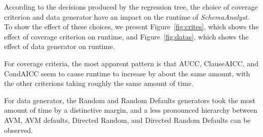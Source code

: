 
According to the decisions produced by the regression tree, the choice of coverage criterion and data generator have an
impact on the runtime of \textit{SchemaAnalyst}. To show the effect of these choices, we present
Figure~\ref{fig:crites}, which shows the effect of coverage criterion on runtime, and Figure~\ref{fig:datas}, which
shows the effect of data generator on runtime.

For coverage criteria, the most apparent pattern is that AUCC, ClauseAICC, and CondAICC seem to cause runtime to
increase by about the same amount, with the other criterions taking roughly the same amount of time.

For data generator, the Random and Random Defaults generators took the most amount of time by a distinctive margin, and
a less pronounced hierarchy between AVM, AVM defaults, Directed Random, and Directed Random Defaults can be observed.


